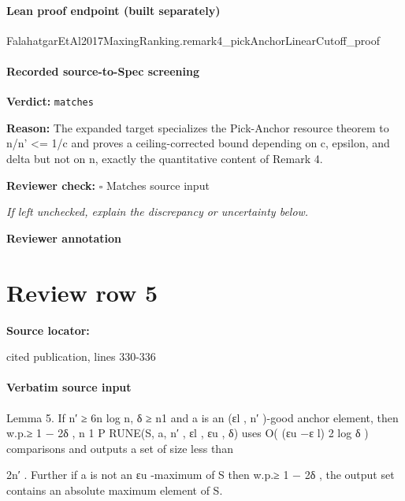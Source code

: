 \documentclass[10pt]{article}
\newcommand{\reviewerbox}{%
  \par\noindent\fbox{\parbox{0.96\linewidth}{\rule{0pt}{0.38in}}}\par
}
\newcommand{\reviewmatch}[1]{%
  \par\noindent\textbf{Reviewer check:} $\square$\; #1\par
  \noindent\emph{If left unchecked, explain the discrepancy or uncertainty below.}\par
}
\begin{document}
\paragraph{Lean proof endpoint (built separately)}\begin{ReviewVerbatim}
FalahatgarEtAl2017MaxingRanking.remark4_pickAnchorLinearCutoff_proof
\end{ReviewVerbatim}

\paragraph{Recorded source-to-Spec screening}
\textbf{Verdict:} \texttt{matches}
\\
{\raggedright
\textbf{Reason:} The expanded target specializes the Pick-\allowbreak{}Anchor resource theorem to n/\allowbreak{}n' <= 1/\allowbreak{}c and proves a ceiling-\allowbreak{}corrected bound depending on c, epsilon, and delta but not on n, exactly the quantitative content of Remark 4.\allowbreak{}
\par}
\reviewmatch{Matches source input}
\noindent\textbf{Reviewer annotation}\par
\reviewerbox
\clearpage
\hypertarget{source-claim-4c6c294211fead99}{}
\section*{Review row 5}
\textbf{Source locator:} {\footnotesize\raggedright cited publication, lines 330-\allowbreak{}336\par}
\paragraph{Verbatim source input}
\begin{ReviewVerbatim}
Lemma 5. If n′ ≥ 6n log n, δ ≥ n1 and a is an (εl , n′ )-good anchor element, then w.p.≥ 1 − 2δ ,
                                           n          1
P RUNE(S, a, n′ , εl , εu , δ) uses O( (εu −ε l)
                                                2 log δ ) comparisons and outputs a set of size less than

2n′ . Further if a is not an εu -maximum of S then w.p.≥ 1 − 2δ , the output set contains an absolute
maximum element of S.
\end{ReviewVerbatim}
\end{document}
